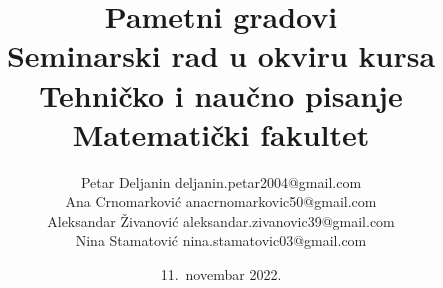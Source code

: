 \documentclass[a4paper,12pt]{article}
\begin{document}
\title{\vspace{-8em}Pametni gradovi\\ \small{Seminarski rad u okviru kursa\\Tehničko i naučno pisanje\\ Matematički fakultet}}

\author{Petar Deljanin  deljanin.petar2004@gmail.com\\Ana Crnomarković anacrnomarkovic50@gmail.com\\ Aleksandar Živanović aleksandar.zivanovic39@gmail.com\\ Nina Stamatović nina.stamatovic03@gmail.com}
\date{11.~novembar 2022.}
\maketitle
\end{document}
